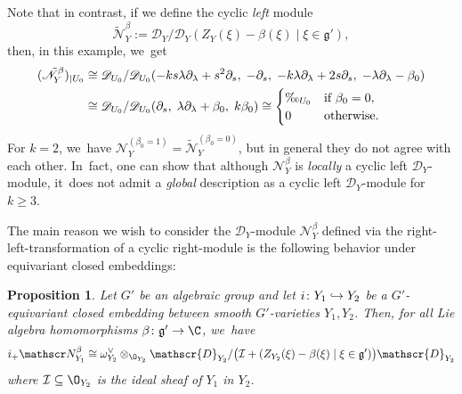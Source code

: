 \documentclass[JEP,XML,SOM,Unicode,published]{cedram}
\newcommand\hto{\mathrel{\lhook\joinrel\to}}
\newtheorem{prop}[thm]{Proposition}
\newcommand{\frg}{\mathfrak{g}}
\newcommand\restrK[2]{{(#1)_{| {#2}}}}
\begin{document}
\begin{exa}
Note that in contrast, if we define the cyclic \emph{left} module
\[
\tilde{\mathscr N}_Y^\beta := \mathscr{D}_Y/\mathscr{D}_Y(Z_Y(\xi)-\beta(\xi) \mid \xi \in \frg'),
\]
then, in this example, we~get
\begin{align*}
\restrK{\tilde{\mathscr N}_Y^\beta}{U_0} &\cong
\mathscr{D}_{U_0}/\mathscr{D}_{U_0}(
-ks \lambda \partial_\lambda + s^2 \partial_s, \;
-\partial_s, \;
-k \lambda \partial_\lambda + 2 s \partial_s, \;
-\lambda \partial_\lambda - \beta_0) \\
&\cong \mathscr{D}_{U_0}/\mathscr{D}_{U_0}(
\partial_s, \;
\lambda \partial_\lambda + \beta_0, \;
k \beta_0)
\cong
\begin{cases}
\O_{U_0} &\text{if } \beta_0 = 0, \\
0 &\text{otherwise}.
\end{cases}
\end{align*}
For $k = 2$, we~have $\mathscr N_Y^{(\beta_0=1)} = \tilde{\mathscr N}_Y^{(\beta_0=0)}$, but in general they do not agree with each other. In~fact, one can show that although $\mathscr{N}_Y^\beta$ is \emph{locally} a cyclic left $\mathscr D_Y$\nobreakdash-mod\-ule, it~does not admit a \emph{global} description as a cyclic left $\mathscr D_Y$\nobreakdash-mod\-ule for $k \geq 3$.
\end{exa}

The main reason we wish to consider the $\mathscr D_Y$\nobreakdash-mod\-ule $\mathscr N_Y^\beta$ defined via the right-left-transformation of a cyclic right\nobreakdash-mod\-ule is the following behavior under equivariant closed embeddings:

\begin{prop} \label{prop:directImageOfNbeta}
Let $G'$ be an algebraic group and let $i \colon Y_1 \hto Y_2$ be a $G'$\nobreakdash-equi\-variant closed embedding between smooth $G'$-varieties $Y_1,Y_2$.
Then, for all Lie algebra homomorphisms $\beta \colon \frg' \to \C$, we~have
\[
i_+ \mathscr N_{Y_1}^\beta \cong \omega_{Y_2}^\vee \otimes_{\O_{Y_2}} \mathscr{D}_{Y_2}/\big(\mathcal{I} + (Z_{Y_2}(\xi)-\beta(\xi) \mid \xi \in \frg')\big)\mathscr{D}_{Y_2}
\]
where $\mathcal {I} \subseteq \O_{Y_2}$ is the ideal sheaf of $Y_1$ in $Y_2$.
\end{prop}
\end{document}
